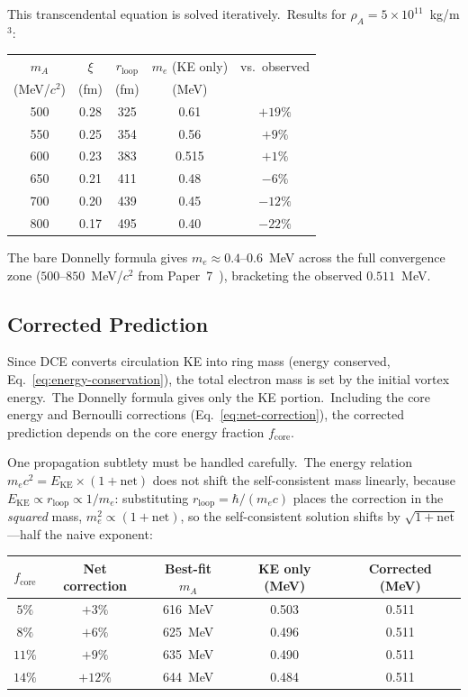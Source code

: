 \documentclass[12pt,letterpaper]{article}
\newcommand{\rhoa}{\rho_{\!A}}
\newcommand{\rloop}{r_{\mathrm{loop}}}
\begin{document}
This transcendental equation is solved iteratively.\ Results for
$\rhoa = 5 \times 10^{11}$~kg/m$^3$:

\begin{center}
\begin{tabular}{@{}ccccc@{}}
\toprule
$m_A$ & $\xi$ & $\rloop$ & $m_e$ (KE only) & vs.\ observed \\
(MeV/$c^2$) & (fm) & (fm) & (MeV) & \\
\midrule
500 & 0.28 & 325 & 0.61 & $+19\%$ \\
550 & 0.25 & 354 & 0.56 & $+9\%$ \\
600 & 0.23 & 383 & 0.515 & $+1\%$ \\
650 & 0.21 & 411 & 0.48 & $-6\%$ \\
700 & 0.20 & 439 & 0.45 & $-12\%$ \\
800 & 0.17 & 495 & 0.40 & $-22\%$ \\
\bottomrule
\end{tabular}
\end{center}

The bare Donnelly formula gives $m_e \approx 0.4$--$0.6$~MeV across the
full convergence zone ($500$--$850$~MeV/$c^2$ from
Paper~7~\cite{otto-quantum}), bracketing the observed $0.511$~MeV.

\subsection{Corrected Prediction}
\label{sec:corrected}

Since DCE converts circulation KE into ring mass (energy conserved,
Eq.~\ref{eq:energy-conservation}), the total electron mass is set by the
initial vortex energy.\ The Donnelly formula gives only the KE portion.\
Including the core energy and Bernoulli corrections
(Eq.~\ref{eq:net-correction}), the corrected prediction depends on the core
energy fraction $f_{\mathrm{core}}$.

One propagation subtlety must be handled carefully.\ The energy relation
$m_e c^2 = E_{\mathrm{KE}} \times (1 + \mathrm{net})$ does not shift the
self-consistent mass linearly, because
$E_{\mathrm{KE}} \propto \rloop \propto 1/m_e$: substituting
$\rloop = \hbar/(m_e c)$ places the correction in the \emph{squared}
mass, $m_e^2 \propto (1 + \mathrm{net})$, so the self-consistent solution
shifts by $\sqrt{1 + \mathrm{net}}$---half the naive exponent:

\begin{center}
\begin{tabular}{@{}ccccc@{}}
\toprule
$f_{\mathrm{core}}$ & Net correction & Best-fit $m_A$ & KE only (MeV) &
Corrected (MeV) \\
\midrule
$5\%$ & $+3\%$ & 616~MeV & 0.503 & 0.511 \\
$8\%$ & $+6\%$ & 625~MeV & 0.496 & 0.511 \\
$11\%$ & $+9\%$ & 635~MeV & 0.490 & 0.511 \\
$14\%$ & $+12\%$ & 644~MeV & 0.484 & 0.511 \\
\bottomrule
\end{tabular}
\end{center}
\end{document}
